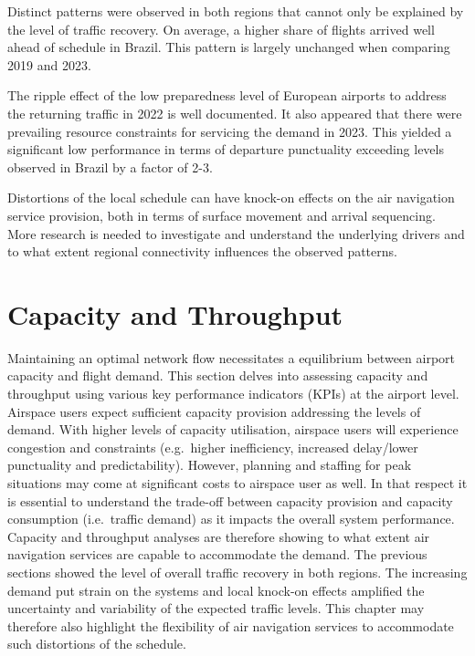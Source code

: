\documentclass[
  a4paper,
  DIV=11,
  numbers=noendperiod]{scrreport}
\begin{document}
Distinct patterns were observed in both regions that cannot only be
explained by the level of traffic recovery. On average, a higher share
of flights arrived well ahead of schedule in Brazil. This pattern is
largely unchanged when comparing 2019 and 2023.

The ripple effect of the low preparedness level of European airports to
address the returning traffic in 2022 is well documented. It also
appeared that there were prevailing resource constraints for servicing
the demand in 2023. This yielded a significant low performance in terms
of departure punctuality exceeding levels observed in Brazil by a factor
of 2-3.

Distortions of the local schedule can have knock-on effects on the air
navigation service provision, both in terms of surface movement and
arrival sequencing. More research is needed to investigate and
understand the underlying drivers and to what extent regional
connectivity influences the observed patterns.


\hypertarget{capacity-and-throughput}{%
\chapter{Capacity and Throughput}\label{capacity-and-throughput}}

Maintaining an optimal network flow necessitates a equilibrium between
airport capacity and flight demand. This section delves into assessing
capacity and throughput using various key performance indicators (KPIs)
at the airport level. Airspace users expect sufficient capacity
provision addressing the levels of demand. With higher levels of
capacity utilisation, airspace users will experience congestion and
constraints (e.g.~higher inefficiency, increased delay/lower punctuality
and predictability). However, planning and staffing for peak situations
may come at significant costs to airspace user as well. In that respect
it is essential to understand the trade-off between capacity provision
and capacity consumption (i.e.~traffic demand) as it impacts the overall
system performance. Capacity and throughput analyses are therefore
showing to what extent air navigation services are capable to
accommodate the demand. The previous sections showed the level of
overall traffic recovery in both regions. The increasing demand put
strain on the systems and local knock-on effects amplified the
uncertainty and variability of the expected traffic levels. This chapter
may therefore also highlight the flexibility of air navigation services
to accommodate such distortions of the schedule.
\end{document}
